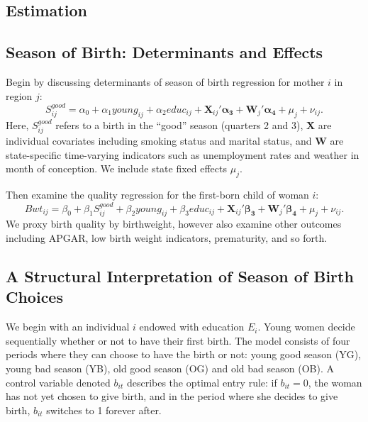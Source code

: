 \documentclass[a4paper, 11 pt]{article}
\theoremstyle{plain}
\begin{document}
\begin{spacing}{1.2}
\section{Estimation}
\subsection{Season of Birth: Determinants and Effects}

Begin by discussing determinants of season of birth regression for mother $i$ in 
region $j$:
\begin{equation}
\label{eqn:season}
S^{good}_{ij} = \alpha_0 + \alpha_1 young_{ij} + \alpha_2 educ_{ij}  + 
\mathbf{X}_{ij}'\mathbf{\alpha_3} + \mathbf{W}_{j}'\mathbf{\alpha_4} + \mu_j +\nu_{ij}. 
\end{equation}
Here, $S^{good}_{ij}$ refers to a birth in the ``good'' season (quarters 2 and 3),
$\mathbf{X}$ are individual covariates including smoking status and marital status,
and $\mathbf{W}$ are state-specific time-varying indicators such as unemployment
rates and weather in month of conception.  We include state fixed effects $\mu_j$.

Then examine the quality regression for the first-born child of woman $i$:
\begin{equation}
\label{eqn:quality}
Bwt_{ij} = \beta_0 + \beta_1 S^{good}_{ij} + \beta_2 young_{ij} + \beta_3 educ_{ij}  + 
\mathbf{X}_{ij}'\mathbf{\beta_3} + \mathbf{W}_{j}'\mathbf{\beta_4} + \mu_j +\nu_{ij}. 
\end{equation}
We proxy birth quality by birthweight, however also examine other outcomes 
including APGAR, low birth weight indicators, prematurity, and so forth.


\subsection{A Structural Interpretation of Season of Birth Choices}
We begin with an individual $i$ endowed with education $E_i$.  Young women
decide sequentially whether or not to have their first birth.  The model 
consists of four periods where they can choose to have the birth or not: young
good season (YG), young bad season (YB), old good season (OG) and old bad
season (OB).  A control variable denoted $b_{it}$ describes the optimal entry
rule: if $b_{it}=0$, the woman has not yet chosen to give birth, and in the
period where she decides to give birth, $b_{it}$ switches to 1 forever after. 


\end{spacing}
\end{document}
